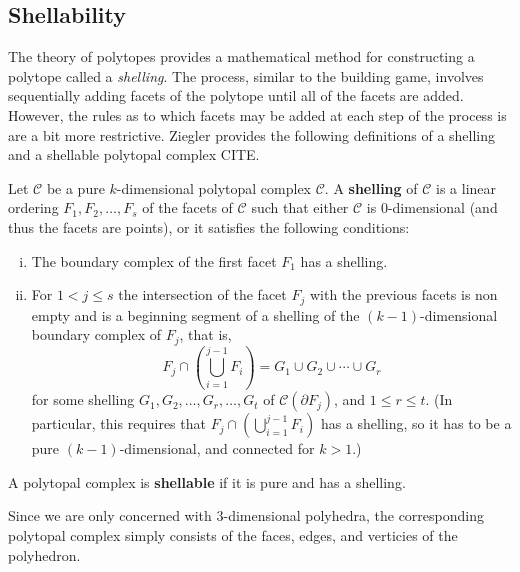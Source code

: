 \subsection{Shellability}
The theory of polytopes provides a mathematical method for constructing a polytope called a \textit{shelling}. The process, similar to the building game, involves sequentially adding facets of the polytope until all of the facets are added. However, the rules as to which facets may be added at each step of the process is are a bit more restrictive. Ziegler provides the following definitions of a shelling and a shellable polytopal complex CITE. 
\begin{mydef}
\label{def:shelling}
Let $\mathcal{C}$ be a pure $k$-dimensional polytopal complex $\mathcal{C}$. A \textbf{shelling} of $\mathcal{C}$ is a linear ordering $F_1,F_2,\dots,F_s$ of the facets of $\mathcal{C}$ such that either $\mathcal{C}$ is $0$-dimensional (and thus the facets are points), or it satisfies the following conditions:
\begin{enumerate}[(i)]
\item The boundary complex of the first facet $F_1$ has a shelling.
\item For $1 < j \leq s$ the intersection of the facet $F_j$ with the previous facets is non empty and is a beginning segment of a shelling of the $(k-1)$-dimensional boundary complex of $F_j$, that is,
$$F_j \cap \left(\bigcup_{i=1}^{j-1}F_i\right) = G_1 \cup G_2 \cup \cdots \cup G_r$$
for some shelling $G_1, G_2, \dots, G_r, \dots, G_t$ of $\mathcal{C}(\partial F_j)$, and $1 \leq r \leq t$. (In particular, this requires that $F_j \cap (\bigcup_{i=1}^{j-1} F_i)$ has a shelling, so it has to be a pure $(k-1)$-dimensional, and connected for $k > 1$.)
\end{enumerate} 
\end{mydef}

\begin{mydef}
A polytopal complex is \textbf{shellable} if it is pure and has a shelling. 
\end{mydef}

Since we are only concerned with $3$-dimensional polyhedra, the corresponding polytopal complex simply consists of the faces, edges, and verticies of the polyhedron. 



